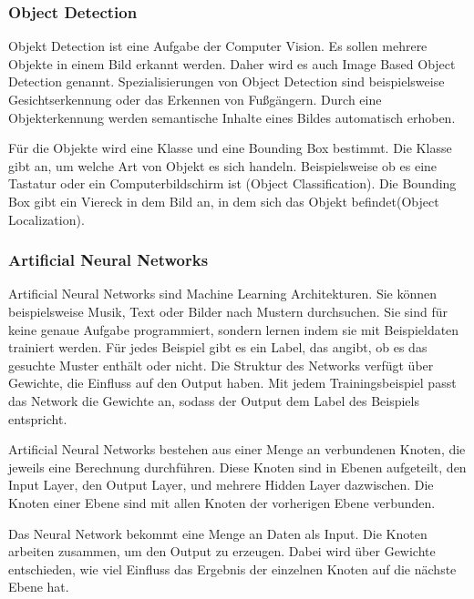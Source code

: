 \subsubsection{Object Detection}

Objekt Detection ist eine Aufgabe der Computer Vision. Es sollen mehrere Objekte in einem Bild erkannt werden. Daher wird es auch Image Based Object Detection genannt. Spezialisierungen von Object Detection sind beispielsweise Gesichtserkennung oder das Erkennen von Fußgängern. Durch eine Objekterkennung werden semantische Inhalte eines Bildes automatisch erhoben. 

Für die Objekte wird eine Klasse und eine Bounding Box bestimmt. Die Klasse gibt an, um welche Art von Objekt es sich handeln. Beispielsweise ob es eine Tastatur oder ein Computerbildschirm ist (Object Classification). Die Bounding Box gibt ein Viereck in dem Bild an, in dem sich das Objekt befindet(Object Localization). \citep{objectdetection,objectDetectionReview}



\subsubsection{Artificial Neural Networks}
Artificial Neural Networks sind Machine Learning Architekturen. Sie können beispielsweise Musik, Text oder Bilder nach Mustern durchsuchen. Sie sind für keine genaue Aufgabe programmiert, sondern lernen indem sie mit Beispieldaten trainiert werden. Für jedes Beispiel gibt es ein Label, das angibt, ob es das gesuchte Muster enthält oder nicht. Die Struktur des Networks verfügt über Gewichte, die Einfluss auf den Output haben. Mit jedem Trainingsbeispiel passt das Network die Gewichte an, sodass der Output dem Label des Beispiels entspricht.\citep{introToCNN,surveyOfDeepLearing}

Artificial Neural Networks bestehen aus einer Menge an verbundenen Knoten, die jeweils eine Berechnung durchführen. Diese Knoten sind in Ebenen aufgeteilt, den Input Layer, den Output Layer, und mehrere Hidden Layer dazwischen. Die Knoten einer Ebene sind mit allen Knoten der vorherigen Ebene verbunden.\citep{introToCNN,surveyOfDeepLearing}

Das Neural Network bekommt eine Menge an Daten als Input. Die Knoten arbeiten zusammen, um den Output zu erzeugen. Dabei wird über Gewichte entschieden, wie viel Einfluss das Ergebnis der einzelnen Knoten auf die nächste Ebene hat.\citep{introToCNN,surveyOfDeepLearing}

